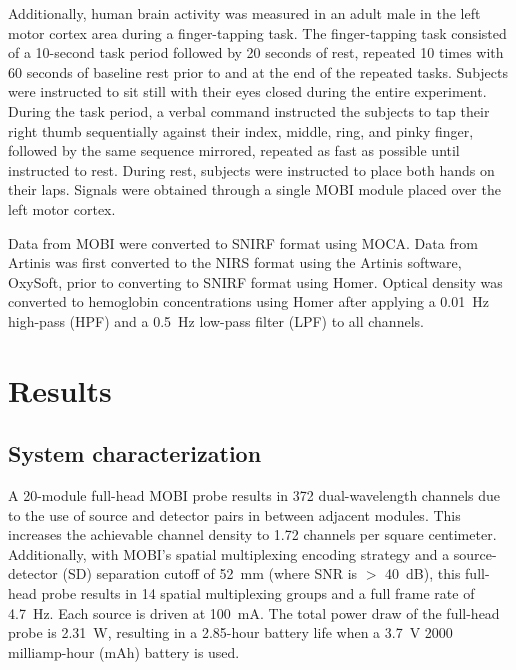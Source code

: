 Additionally, human brain activity was measured in an adult male in the left motor cortex area during a finger-tapping task. The finger-tapping task consisted of a 10-second task period followed by 20 seconds of rest, repeated 10 times with 60 seconds of baseline rest prior to and at the end of the repeated tasks. Subjects were instructed to sit still with their eyes closed during the entire experiment. During the task period, a verbal command instructed the subjects to tap their right thumb sequentially against their index, middle, ring, and pinky finger, followed by the same sequence mirrored, repeated as fast as possible until instructed to rest. During rest, subjects were instructed to place both hands on their laps. Signals were obtained through a single MOBI module placed over the left motor cortex. 

Data from MOBI were converted to SNIRF format using MOCA. Data from Artinis was first converted to the NIRS format using the Artinis software, OxySoft, prior to converting to SNIRF format using Homer. Optical density was converted to hemoglobin concentrations using Homer after applying a 0.01~Hz high-pass (HPF) and a 0.5~Hz low-pass filter (LPF) to all channels. 



\section{Results}
\label{chap:mobi:results}
\subsection{System characterization}
A 20-module full-head MOBI probe results in 372 dual-wavelength channels due to the use of source and detector pairs in between adjacent modules. This increases the achievable channel density to 1.72 channels per square centimeter. Additionally, with MOBI's spatial multiplexing encoding strategy and a source-detector (SD) separation cutoff of 52~mm (where SNR is $>$ 40~dB), this full-head probe results in 14 spatial multiplexing groups and a full frame rate of 4.7~Hz. Each source is driven at 100~mA. The total power draw of the full-head probe is 2.31~W, resulting in a 2.85-hour battery life when a 3.7~V 2000 milliamp-hour (mAh) battery is used.

